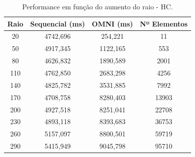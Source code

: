 \begin{table}[H]
    \centering
    \caption[Performance em função do aumento do raio - HC]{Performance em função do aumento do raio - HC.
    \label{tab:limit2}}
   \begin{tabular}{c c c c}
        \toprule
           Raio &Sequencial (ms)&OMNI (ms) &Nº Elementos\\
        \midrule
            20 & 4742,696 & 254,221 & 11 \\
            50 & 4917,345 & 1122,165 & 553 \\
            80 & 4626,832 & 1890,589 & 2001 \\
            110 & 4762,850 & 2683,298 & 4256 \\
            140 & 4825,782 & 3531,885 & 7992 \\
            170 & 4708,758 & 8280,403 & 13903 \\
            200 & 4927,518 & 8251,041 & 22708 \\
            230 & 4893,118 & 8393,683 & 36753 \\
            260 & 5157,097 & 8800,501 & 59719 \\
            290 & 5415,949 & 9045,798 & 95710 \\
           
        \bottomrule
    \end{tabular}
\end{table}